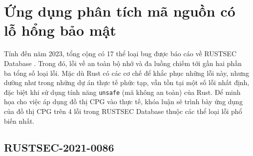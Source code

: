 \section{Ứng dụng phân tích mã nguồn có lỗ hổng bảo mật}

Tính đến năm 2023, tổng cộng có 17 thể loại bug được báo cáo về RUSTSEC Database \cite{zheng2023closer}.
Trong đó, lỗi về an toàn bộ nhớ và đa luồng chiếm tới gần hai phần ba tổng số loại lỗi.
Mặc dù Rust có các cơ chế để khắc phục những lỗi này, nhưng dường như trong những dự án thực tế phức tạp, vẫn tồn tại một số lỗi nhất định, đặc biệt khi sử dụng tính năng \texttt{unsafe} (mã không an toàn) của Rust.
Để minh họa cho việc áp dụng đồ thị CPG vào thực tế, khóa luận sẽ trình bày ứng dụng của đồ thị CPG trên 4 lỗi trong RUSTSEC Database thuộc các thể loại lỗi phổ biến nhất.

\subsection{RUSTSEC-2021-0086}




